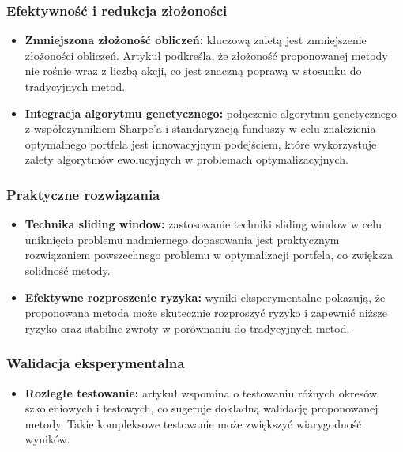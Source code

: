 \documentclass[polish,envcountsect,10pt]{article}
\begin{document}
\subsubsection{Efektywność i redukcja złożoności}

\begin{itemize}
	\item \textbf{Zmniejszona złożoność obliczeń:}
    kluczową zaletą jest zmniejszenie złożoności obliczeń. Artykuł podkreśla, że złożoność proponowanej metody nie rośnie wraz z liczbą akcji, co jest znaczną poprawą w stosunku do tradycyjnych metod.
	\item \textbf{Integracja algorytmu genetycznego:}
    połączenie algorytmu genetycznego z współczynnikiem Sharpe’a i standaryzacją funduszy w celu znalezienia optymalnego portfela jest innowacyjnym podejściem, które wykorzystuje zalety algorytmów ewolucyjnych w problemach optymalizacyjnych.
\end{itemize}

\subsubsection{Praktyczne rozwiązania}

\begin{itemize}
	\item \textbf{Technika sliding window:}
    zastosowanie techniki sliding window w celu uniknięcia problemu nadmiernego dopasowania jest praktycznym rozwiązaniem powszechnego problemu w optymalizacji portfela, co zwiększa solidność metody.
	\item \textbf{Efektywne rozproszenie ryzyka:}
    wyniki eksperymentalne pokazują, że proponowana metoda może skutecznie rozproszyć ryzyko i zapewnić niższe ryzyko oraz stabilne zwroty w porównaniu do tradycyjnych metod.
\end{itemize}

\subsubsection{Walidacja eksperymentalna}

\begin{itemize}
	\item \textbf{Rozległe testowanie:}
    artykuł wspomina o testowaniu różnych okresów szkoleniowych i testowych, co sugeruje dokładną walidację proponowanej metody. Takie kompleksowe testowanie może zwiększyć wiarygodność wyników.
\end{itemize}
\end{document}
